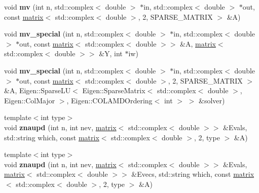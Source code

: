 \begin{DoxyCompactItemize}
\item 
\hypertarget{namespacekeycpp_a03c6774bc936a2d93af7ce9a32f25513}{void {\bfseries mv} (int n, std\-::complex$<$ double $>$ $\ast$in, std\-::complex$<$ double $>$ $\ast$out, const \hyperlink{classkeycpp_1_1matrix}{matrix}$<$ std\-::complex$<$ double $>$, 2, S\-P\-A\-R\-S\-E\-\_\-\-M\-A\-T\-R\-I\-X $>$ \&A)}\label{namespacekeycpp_a03c6774bc936a2d93af7ce9a32f25513}

\item 
\hypertarget{namespacekeycpp_adbe452cbd5260ac6506b4e3183648ea5}{void {\bfseries mv\-\_\-special} (int n, std\-::complex$<$ double $>$ $\ast$in, std\-::complex$<$ double $>$ $\ast$out, const \hyperlink{classkeycpp_1_1matrix}{matrix}$<$ std\-::complex$<$ double $>$$>$ \&A, \hyperlink{classkeycpp_1_1matrix}{matrix}$<$ std\-::complex$<$ double $>$$>$ \&Y, int $\ast$iw)}\label{namespacekeycpp_adbe452cbd5260ac6506b4e3183648ea5}

\item 
\hypertarget{namespacekeycpp_a3d58a4fe9b658d14a5a10df3956eb51f}{void {\bfseries mv\-\_\-special} (int n, std\-::complex$<$ double $>$ $\ast$in, std\-::complex$<$ double $>$ $\ast$out, const \hyperlink{classkeycpp_1_1matrix}{matrix}$<$ std\-::complex$<$ double $>$, 2, S\-P\-A\-R\-S\-E\-\_\-\-M\-A\-T\-R\-I\-X $>$ \&A, Eigen\-::\-Sparse\-L\-U$<$ Eigen\-::\-Sparse\-Matrix$<$ std\-::complex$<$ double $>$, Eigen\-::\-Col\-Major $>$, Eigen\-::\-C\-O\-L\-A\-M\-D\-Ordering$<$ int $>$ $>$ \&solver)}\label{namespacekeycpp_a3d58a4fe9b658d14a5a10df3956eb51f}

\item 
\hypertarget{namespacekeycpp_a42252cd439a48584ce227e75471f5532}{{\footnotesize template$<$int type$>$ }\\void {\bfseries znaupd} (int n, int nev, \hyperlink{classkeycpp_1_1matrix}{matrix}$<$ std\-::complex$<$ double $>$$>$ \&Evals, std\-::string which, const \hyperlink{classkeycpp_1_1matrix}{matrix}$<$ std\-::complex$<$ double $>$, 2, type $>$ \&A)}\label{namespacekeycpp_a42252cd439a48584ce227e75471f5532}

\item 
\hypertarget{namespacekeycpp_a44191deca39b1d9ec39037e6cb84bce4}{{\footnotesize template$<$int type$>$ }\\void {\bfseries znaupd} (int n, int nev, \hyperlink{classkeycpp_1_1matrix}{matrix}$<$ std\-::complex$<$ double $>$$>$ \&Evals, \hyperlink{classkeycpp_1_1matrix}{matrix}$<$ std\-::complex$<$ double $>$$>$ \&Evecs, std\-::string which, const \hyperlink{classkeycpp_1_1matrix}{matrix}$<$ std\-::complex$<$ double $>$, 2, type $>$ \&A)}\label{namespacekeycpp_a44191deca39b1d9ec39037e6cb84bce4}


\end{DoxyCompactItemize}

